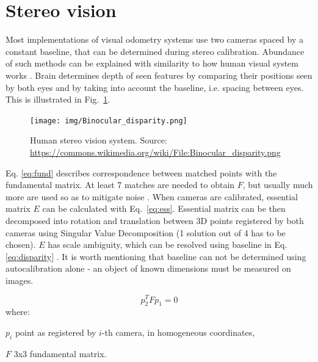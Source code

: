 \section{Stereo vision}
\label{sec:stereo}

Most implementations of visual odometry systems use two cameras spaced by a constant baseline, that can be determined during stereo calibration. Abundance of such methods can be explained with similarity to how human visual system works \cite{cyganek}. Brain determines depth of seen features by comparing their positions seen by both eyes and by taking into account the baseline, i.e. spacing between eyes. This is illustrated in Fig.~\ref{fig:stereo}.

\begin{figure}[ht]
	\centering\texttt{[image: img/Binocular\_disparity.png]}
	\caption{Human stereo vision system. Source: \url{https://commons.wikimedia.org/wiki/File:Binocular_disparity.png}}
	\label{fig:stereo}
\end{figure}

Eq. \ref{eq:fund} describes correspondence between matched points with the fundamental matrix. At least 7 matches are needed to obtain $F$, but usually much more are used so as to mitigate noise \cite{zhang1998determining}. When cameras are calibrated, essential matrix $E$ can be calculated with Eq.~\ref{eq:ess}. Essential matrix can be then decomposed into rotation and translation between 3D points registered by both cameras using Singular Value Decomposition (1 solution out of 4 has to be chosen). $E$ has scale ambiguity, which can be resolved using baseline in Eq. \ref{eq:disparity} \cite{improving}. It is worth mentioning that baseline can not be determined using autocalibration alone - an object of known dimensions must be measured on images.

\begin{equation}
p_{2}^{T}Fp_{1}=0
\label{eq:fund}
\end{equation}
where:
\begin{eqwhere}[2cm]
	\item[$p_{i}$] point as registered by $i$-th camera, in homogeneous coordinates,
	\item[$F$] 3x3 fundamental matrix.
\end{eqwhere}

